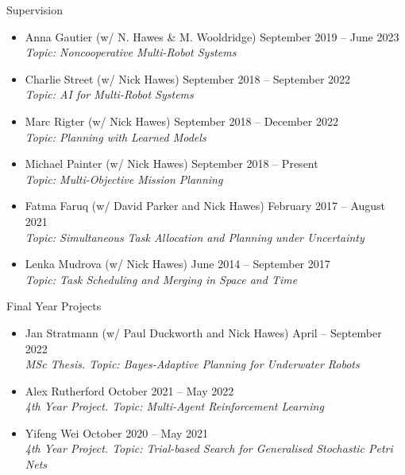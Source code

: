 \begin{rSection}{Supervision}
\begin{itemize}
\item Anna Gautier (w/ N. Hawes \& M. Wooldridge) \hfill September 2019 -- June 2023\\
\textit{Topic: Noncooperative Multi-Robot Systems}

\item  Charlie Street (w/ Nick Hawes) \hfill September 2018 -- September 2022\\
\textit{Topic: AI for Multi-Robot Systems}

\item  Marc Rigter (w/ Nick Hawes) \hfill September 2018 -- December 2022\\
\textit{Topic: Planning with Learned Models}

\item  Michael Painter  (w/ Nick Hawes) \hfill September 2018 -- Present\\
\textit{Topic: Multi-Objective Mission Planning}

\item  Fatma Faruq  (w/ David Parker and Nick Hawes) \hfill February 2017 -- August 2021\\
\textit{Topic: Simultaneous Task Allocation and Planning under Uncertainty}

\item  Lenka Mudrova (w/ Nick Hawes) \hfill June 2014 -- September 2017\\
\textit{Topic: Task Scheduling and Merging in Space and Time}

\end{itemize}

\item Final Year Projects

\begin{itemize}

\item Jan Stratmann (w/ Paul Duckworth and Nick Hawes)  \hfill April -- September 2022\\
\textit{MSc Thesis. Topic: Bayes-Adaptive Planning for Underwater Robots}

\item Alex Rutherford  \hfill October 2021 -- May 2022\\
\textit{4th Year Project. Topic: Multi-Agent Reinforcement Learning}

\item Yifeng Wei  \hfill October 2020 -- May 2021\\
\textit{4th Year Project. Topic: Trial-based Search for Generalised Stochastic Petri Nets}


\end{itemize}
\end{rSection}
